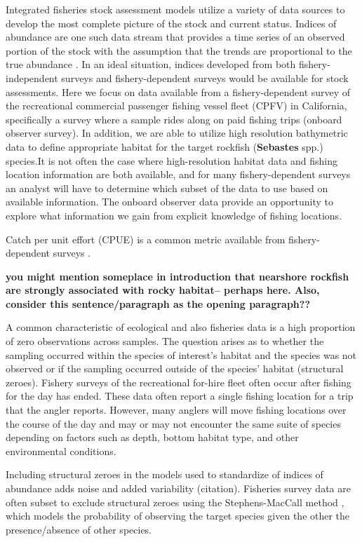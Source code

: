 \documentclass[
  12pt,
  authoryear,
  preprint,
  3p]{elsarticle}
\begin{document}
Integrated fisheries stock assessment models utilize a variety of data
sources to develop the most complete picture of the stock and current
status. Indices of abundance are one such data stream that provides a
time series of an observed portion of the stock with the assumption that
the trends are proportional to the true abundance
\citep{Harley:2001:CUE}. In an ideal situation, indices developed from
both fishery-independent surveys and fishery-dependent surveys would be
available for stock assessments. Here we focus on data available from a
fishery-dependent survey of the recreational commercial passenger
fishing vessel fleet (CPFV) in California, specifically a survey where a
sample rides along on paid fishing trips (onboard observer survey). In
addition, we are able to utilize high resolution bathymetric data to
define appropriate habitat for the target rockfish (\textbf{Sebastes}
spp.) species.It is not often the case where high-resolution habitat
data and fishing location information are both available, and for many
fishery-dependent surveys an analyst will have to determine which subset
of the data to use based on available information. The onboard observer
data provide an opportunity to explore what information we gain from
explicit knowledge of fishing locations.

Catch per unit effort (CPUE) is a common metric available from
fishery-dependent surveys \citep{Maunder:2004:SCE}.

\textbf{you might mention someplace in introduction that nearshore
rockfish are strongly associated with rocky habitat-- perhaps here.
Also, consider this sentence/paragraph as the opening paragraph??}

A common characteristic of ecological and also fisheries data is a high
proportion of zero observations across samples. The question arises as
to whether the sampling occurred within the species of interest's
habitat and the species was not observed or if the sampling occurred
outside of the species' habitat (structural zeroes). Fishery surveys of
the recreational for-hire fleet often occur after fishing for the day
has ended. These data often report a single fishing location for a trip
that the angler reports. However, many anglers will move fishing
locations over the course of the day and may or may not encounter the
same suite of species depending on factors such as depth, bottom habitat
type, and other environmental conditions.

Including structural zeroes in the models used to standardize of indices
of abundance adds noise and added variability (citation). Fisheries
survey data are often subset to exclude structural zeroes using the
Stephens-MacCall method \citeyearpar{Stephens:2004:MAS}, which models
the probability of observing the target species given the other the
presence/absence of other species.
\end{document}
